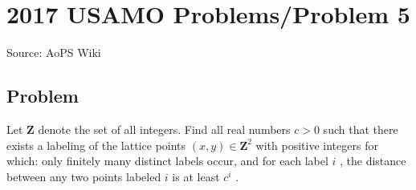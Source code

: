 \documentclass[12pt]{article}
\begin{document}
\section*{{2017 USAMO Problems/Problem 5}}
Source: AoPS Wiki

\subsection*{Problem}
Let $\mathbf{Z}$ denote the set of all integers. Find all real numbers $c > 0$ such that there exists a labeling of the lattice points $( x, y ) \in \mathbf{Z}^2$ with positive integers for which: only finitely many distinct labels occur, and for each label $i$ , the distance between any two points labeled $i$ is at least $c^i$ .
\end{document}

